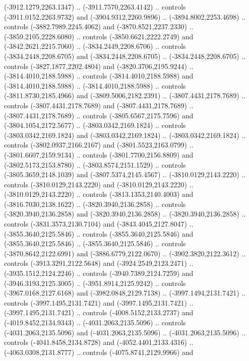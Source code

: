 \begin{scope}[shift={(430.80877,-416.69739)}]
\begin{scope}[shift={(4537.8125,-1856.4436)}]
\begin{scope}[shift={(-148.39113,-28.14259)}]
        (-3912.1279,2263.1347) .. (-3911.7570,2263.4142) .. controls
        (-3911.0152,2263.9732) and (-3904.9312,2260.9896) .. (-3894.8002,2253.4698) ..
        controls (-3882.7989,2245.4062) and (-3870.8521,2237.2330) ..
        (-3859.2105,2228.6080) .. controls (-3850.6621,2222.2749) and
        (-3842.2621,2215.7060) .. (-3834.2449,2208.6706) .. controls
        (-3834.2448,2208.6705) and (-3834.2448,2208.6705) .. (-3834.2448,2208.6705) ..
        controls (-3827.1877,2202.4804) and (-3820.3706,2195.9244) ..
        (-3814.4010,2188.5988) .. controls (-3814.4010,2188.5988) and
        (-3814.4010,2188.5988) .. (-3814.4010,2188.5988) .. controls
        (-3811.8730,2185.4966) and (-3809.5006,2182.2391) .. (-3807.4431,2178.7689) ..
        controls (-3807.4431,2178.7689) and (-3807.4431,2178.7689) ..
        (-3807.4431,2178.7689) .. controls (-3805.6567,2175.7596) and
        (-3804.1054,2172.5677) .. (-3803.0342,2169.1824) .. controls
        (-3803.0342,2169.1824) and (-3803.0342,2169.1824) .. (-3803.0342,2169.1824) ..
        controls (-3802.0937,2166.2167) and (-3801.5523,2163.0799) ..
        (-3801.6607,2159.9134) .. controls (-3801.7700,2156.8809) and
        (-3802.5173,2153.8780) .. (-3803.8574,2151.1529) .. controls
        (-3805.3659,2148.1039) and (-3807.5374,2145.4567) .. (-3810.0129,2143.2220) ..
        controls (-3810.0129,2143.2220) and (-3810.0129,2143.2220) ..
        (-3810.0129,2143.2220) .. controls (-3813.1353,2140.4003) and
        (-3816.7030,2138.1622) .. (-3820.3940,2136.2858) .. controls
        (-3820.3940,2136.2858) and (-3820.3940,2136.2858) .. (-3820.3940,2136.2858) ..
        controls (-3831.3573,2130.7104) and (-3843.4045,2127.8047) ..
        (-3855.3640,2125.5846) .. controls (-3855.3640,2125.5846) and
        (-3855.3640,2125.5846) .. (-3855.3640,2125.5846) .. controls
        (-3870.8642,2122.6991) and (-3886.6779,2122.0670) .. (-3902.3820,2122.3612) ..
        controls (-3913.3291,2122.5648) and (-3924.2549,2123.2471) ..
        (-3935.1512,2124.2246) .. controls (-3940.7389,2124.7259) and
        (-3946.3193,2125.3005) .. (-3951.8914,2125.9242) .. controls
        (-3967.0168,2127.6168) and (-3982.0848,2129.7138) .. (-3997.1494,2131.7421) ..
        controls (-3997.1495,2131.7421) and (-3997.1495,2131.7421) ..
        (-3997.1495,2131.7421) .. controls (-4008.5152,2133.2737) and
        (-4019.8452,2134.9343) .. (-4031.2063,2135.5096) .. controls
        (-4031.2063,2135.5096) and (-4031.2063,2135.5096) .. (-4031.2063,2135.5096) ..
        controls (-4041.8458,2134.8728) and (-4052.4401,2133.4316) ..
        (-4063.0308,2131.8777) .. controls (-4075.8741,2129.9966) and

\end{scope}
\end{scope}
\end{scope}
